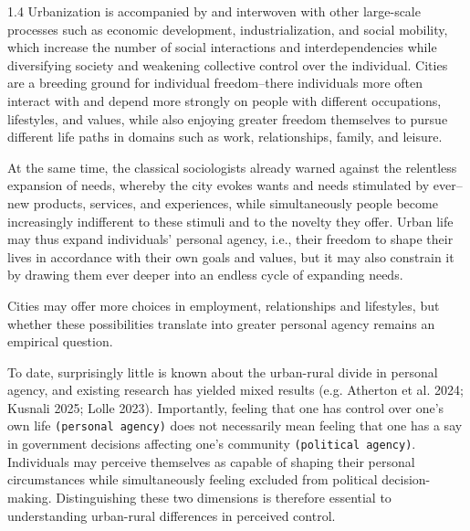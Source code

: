 \documentclass[10pt, letterpaper]{article}
\begin{document}
\begin{spacing}{1.4}
Urbanization is accompanied by and interwoven with other large-scale processes such as economic development, industrialization, and social mobility, which increase the number of social interactions and interdependencies while diversifying society and weakening collective control over the individual. Cities are a breeding ground for individual freedom--there individuals more often interact with and depend more strongly on people with different occupations, lifestyles, and values, while also enjoying greater freedom themselves to pursue different life paths in domains such as work, relationships, family, and leisure. 

At the same time, the classical sociologists already warned against the relentless expansion of needs, whereby the city evokes wants and needs stimulated by ever--new products, services, and experiences, while simultaneously people become increasingly indifferent to these stimuli and to the novelty they offer. Urban life may thus expand individuals' personal agency, i.e., their freedom to shape their lives in accordance with their own goals and values, but it may also constrain it by drawing them ever deeper into an endless cycle of expanding needs. 
%

 Cities may offer more choices in employment, relationships and lifestyles, but whether these possibilities translate into greater personal agency remains an empirical question.

To date, surprisingly little is known about the urban-rural divide in personal agency, and existing research has yielded mixed results (e.g. Atherton et al. 2024; Kusnali 2025; Lolle 2023).
%
Importantly, feeling that one has control over one's own life \texttt{(personal agency)}
does not necessarily mean feeling that one has a say in government decisions
affecting one's community \texttt{(political agency)}. Individuals may perceive themselves as capable of shaping their personal circumstances while simultaneously feeling excluded from political decision-making. Distinguishing these two dimensions is therefore essential to understanding urban-rural differences in perceived control.%


\end{spacing}
\end{document}
